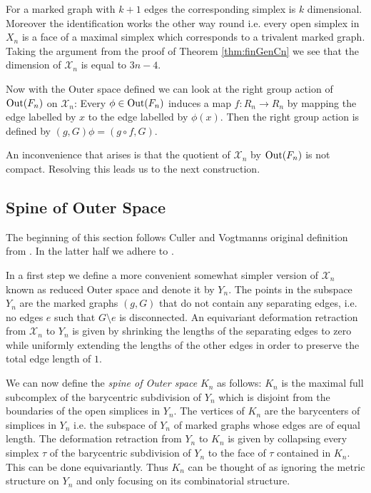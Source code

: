 For a marked graph with $k+1$ edges the corresponding simplex is $k$ dimensional.
Moreover the identification works the other way round i.e. every open simplex in $X_{n}$ 
is a face of a maximal simplex which corresponds to a trivalent marked graph.
Taking the argument from the proof of Theorem \ref{thm:finGenCn} we see that the dimension of $\mathcal{X}_{n}$ is equal to $3n -4$.

Now with the Outer space defined we can look at the right group action of $\operatorname{Out}(F_{n})$ on $\mathcal{X}_{n}$:
Every $\phi \in \operatorname{Out}(F_{n})$ induces a map $f: R_{n} \to R_{n}$ by mapping the edge labelled
by $x$ to the edge labelled by $\phi(x)$.
Then the right group action is defined by $(g,G) \phi = (g \circ f, G)$.

An inconvenience that arises is that the quotient of $\mathcal{X}_{n}$ by $\operatorname{Out}(F_{n})$ is not compact.
Resolving this leads us to the next construction.

\subsection{Spine of Outer Space}
The beginning of this section follows Culler and Vogtmanns original definition from \cite{vogtmann86}.
In the latter half we adhere to \cite{vogtmann16}.

In a first step we define a more convenient somewhat simpler version of $\mathcal{X}_{n}$ known as reduced Outer space and denote it by $Y_{n}$.
The points in the subspace $Y_{n}$ are the marked graphs $(g,G)$ that do not contain any separating edges, i.e.
no edges $e$ such that $G \setminus e$ is disconnected.
An equivariant deformation retraction from $\mathcal{X}_{n}$ to $Y_{n}$ is given by shrinking the lengths of
the separating edges to zero while uniformly extending the lengths of the other edges in order to preserve the total edge length of $1$.

We can now define the \emph{spine of Outer space} $K_{n}$ as follows:
$K_{n}$ is the maximal full subcomplex of the barycentric subdivision of $Y_{n}$ which is disjoint from the boundaries of the open simplices in $Y_{n}$.
The vertices of $K_{n}$ are the barycenters of simplices in $Y_{n}$ i.e. the subspace of $Y_{n}$ of marked graphs whose edges are of equal length.
The deformation retraction from $Y_{n}$ to $K_{n}$ is given by
collapsing every simplex $\tau$ of the barycentric subdivision of $Y_{n}$ to the face of $\tau$ contained in $K_{n}$.
This can be done equivariantly.
Thus $K_{n}$ can be thought of as ignoring the metric structure on $Y_{n}$ and only focusing on its combinatorial structure.


